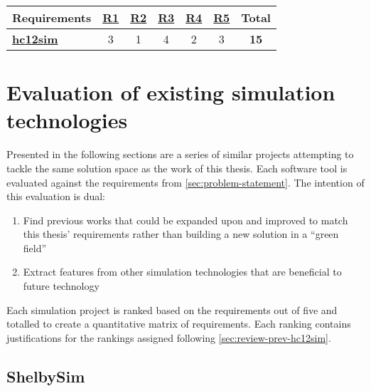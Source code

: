 \begin{table}[h!]
    \centering
    \begin{tabular}{l|cccccc}
        \textbf{Requirements} & \textbf{\hyperref[req:personal]{R1}} & \textbf{\hyperref[req:configuration]{R2}} & \textbf{\hyperref[req:pedagogical]{R3}} & \textbf{\hyperref[req:simulations]{R4}} & \textbf{\hyperref[req:modern]{R5}} & \textbf{Total} \\ \hline
        \textbf{\hyperref[sec:review-prev-hc12sim]{hc12sim} \cite{Brightwell2013}} 
        & 3 & 1 & 4 & 2 & 3 & \textbf{15} \\
    \end{tabular}
\end{table}

\section{Evaluation of existing simulation technologies} 
\label{sec:review}

Presented in the following sections are a series of similar projects attempting to tackle the same solution space as the work of this thesis. Each software tool is evaluated against the requirements from \cref{sec:problem-statement}. The intention of this evaluation is dual:
\begin{enumerate}
    \item Find previous works that could be expanded upon and improved to match this thesis' requirements rather than building a new solution in a ``green field''
    \item Extract features from other simulation technologies that are beneficial to future technology
\end{enumerate}
\noindent Each simulation project is ranked based on the requirements out of five and totalled to create a quantitative matrix of requirements. Each ranking contains justifications for the rankings assigned following \cref{sec:review-prev-hc12sim}.

\subsection{ShelbySim}
\label{sec:review-shelbysim}

